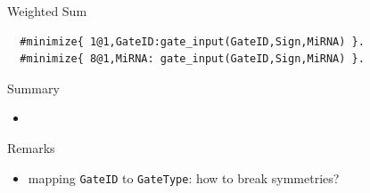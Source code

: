 \documentclass[10pt,dvipsnames]{beamer}
\begin{document}
\begin{frame}[fragile]{Weighted Sum}
 \begin{verbatim}
  #minimize{ 1@1,GateID:gate_input(GateID,Sign,MiRNA) }.
  #minimize{ 8@1,MiRNA: gate_input(GateID,Sign,MiRNA) }.
 \end{verbatim}
\end{frame}

\begin{frame}{Summary}
 \begin{itemize}
  \item 
  
 \end{itemize}

\end{frame}



\begin{frame}{Remarks}
 \begin{itemize}
  \item mapping \texttt{GateID} to \texttt{GateType}: how to break symmetries?
 \end{itemize}

\end{frame}
\end{document}
